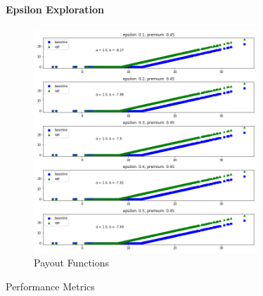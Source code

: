\documentclass[11pt]{article}
\begin{document}
            \paragraph*{Epsilon Exploration}
                \begin{figure}[H]
                    \centering
                    \caption{Payout Functions}
                    \includegraphics[width=0.75\textwidth]{../../output/figures/CVaR/epsilon_exploration_intercept.png}
                \end{figure}

                \begin{table}[H]
                    \centering
                    \caption{Performance Metrics}
                    
                \end{table}

                \FloatBarrier
\end{document}
